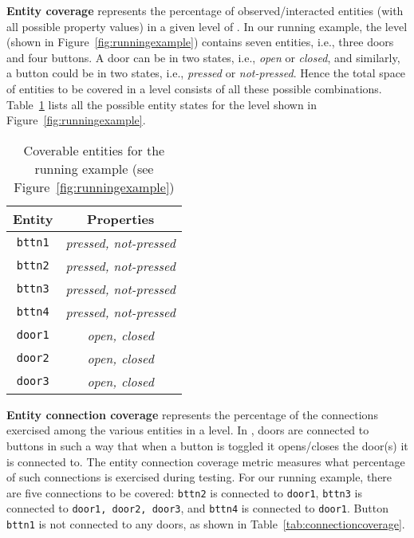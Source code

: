\textbf{Entity coverage} represents the percentage of observed/interacted entities (with all possible property values) in a given level of \sut. In our running example, the \buttonsdoors level (shown in Figure~\ref{fig:runningexample}) contains seven entities, i.e., three doors and four buttons. A door can be in two states, i.e., \emph{open} or \emph{closed}, and similarly, a button could be in two states, i.e., \emph{pressed} or \emph{not-pressed}. Hence the total space of entities to be covered in a level consists of all these possible combinations. Table~\ref{tab:entitycoverage} lists all the possible entity states for the \buttonsdoors level shown in Figure~\ref{fig:runningexample}.

{
\begin{table}[!htb]
    \centering
    \begin{tabular}{c|c}
        \textbf{Entity} & \textbf{Properties}  \\ \hline
        \texttt{bttn1} & \it{pressed}, \it{not-pressed}\\
        \texttt{bttn2} & \it{pressed},  \it{not-pressed}\\
        \texttt{bttn3} & \it{pressed},  \it{not-pressed}\\
        \texttt{bttn4} & \it{pressed},  \it{not-pressed}\\
        \texttt{door1} & \it{open},  \it{closed}\\
        \texttt{door2} & \it{open},  \it{closed}\\
        \texttt{door3} & \it{open},  \it{closed}\\
        \hline
        \end{tabular}
    \caption{Coverable entities for the running example (see Figure~\ref{fig:runningexample})}
    \label{tab:entitycoverage}
\end{table}
}

\textbf{Entity connection coverage} represents the percentage of the connections exercised among the various entities in a level. In \sut, doors are connected to buttons in such a way that when a button is toggled it opens/closes the door(s) it is connected to. The entity connection coverage metric measures what percentage of such connections is exercised during testing. For our running example, there are five connections to be covered: \texttt{bttn2} is connected to \texttt{door1}, \texttt{bttn3} is connected to \texttt{door1, door2, door3}, and \texttt{bttn4} is connected to \texttt{door1}. Button \texttt{bttn1} is not connected to any doors, as shown in Table~\ref{tab:connectioncoverage}.

